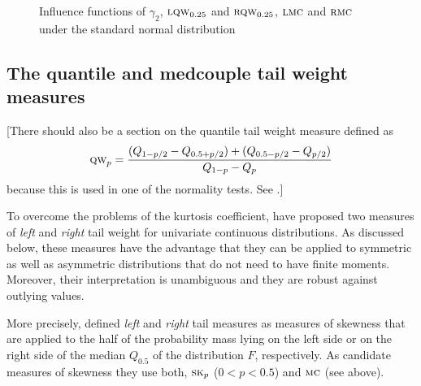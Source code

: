 \begin{figure}[h!]
    \centering
    \caption{Influence functions of $\gamma_2$, $\stsc{LQW}_{0.25}$ and $\stsc{RQW}_{0.25}$, $\stsc{LMC}$ and $\stsc{RMC}$ under the standard normal distribution}
    \label{fig:stat:IF_tail}
\end{figure}

\subsection{The quantile and medcouple tail weight measures}

\alert{[There should also be a section on the quantile tail weight measure defined as
\[
    \stsc{QW}_p = \frac{(Q_{1-p/2} - Q_{0.5+p/2}) + (Q_{0.5-p/2} - Q_{p/2})}{Q_{1-p}-Q_{p}}
\]
because this is used in one of the normality tests. See \citet[p. 432]{brys:etal:2008}.]}

To overcome the problems of the kurtosis coefficient, \citet{brys:etal:2006}
have proposed two measures of \emph{left} and \emph{right} tail weight for
univariate continuous distributions. As discussed below, these measures have
the advantage that they can be applied to symmetric as well as asymmetric
distributions that do not need to have finite moments. Moreover, their
interpretation is unambiguous and they are robust against outlying values.

More precisely, \citet{brys:etal:2006} defined \emph{left} and \emph{right}
tail measures as measures of skewness that are applied to the half of the
probability mass lying on the left side or on the right side of the median
$Q_{0.5}$ of the distribution $F$, respectively. As candidate measures of skewness 
they use both, $\stsc{SK}_p$ ($0<p<0.5$) and $\stsc{MC}$ (see above).

